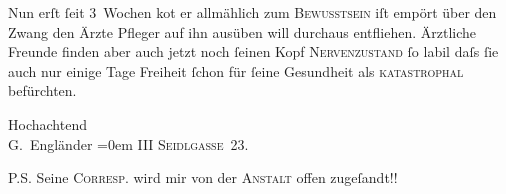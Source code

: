 \pstart
           Nun erſt{ }ſeit 3 {\pb}Wochen ko{\geminationm}t er allmählich zum \textsc{Bewusstsein}{ }{\kaufmannsund} iſt empört über den Zwang den Ärzte{ }{\kaufmannsund} Pfleger auf ihn ausüben {\kaufmannsund}
               will durchaus entfliehen. Ärztliche {\pb}Freunde finden aber auch jetzt noch{ }ſeinen Kopf {\kaufmannsund}{ }\textsc{Nervenzustand}{ }ſo labil daſs{ }ſie auch nur einige Tage
               Freiheit{ }ſchon für{ }ſeine Gesundheit als \textsc{katastrophal}
               befürchten.\pend
           
\pstart
           Hochachtend{\\[\baselineskip]}\spacefill\mbox{G. Engländer}\pend
           \leftskip=0em{}
\pstart
           \noindent{}III \textsc{Seidlgasse} 23.\pend
           
\pstart
           P.S. Seine \textsc{Correſp}. wird mir von der \textsc{Anstalt} offen zugeſandt!!\pend
           \endnumbering{}  \newcommand{\dateiname}{L02120}\newcommand{\titel}{Peter Altenberg und Georg Engländer an Arthur Schnitzler, [Mitte April] 1913}\newcommand{\editorInnen}{Martin Anton Müller und Gerd-Hermann Susen}
